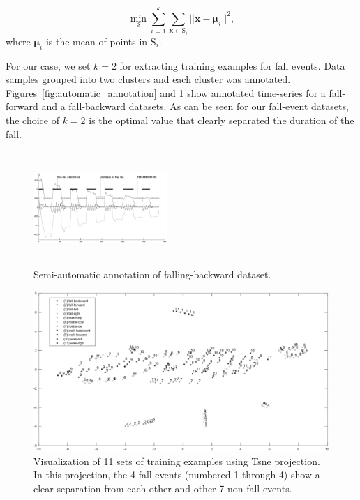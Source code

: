 \documentclass[]{IEEEtran}
\begin{document}
$$ \min _{\mathcal{S}} \sum_{i=1}^{k} \sum_{\mathbf{x} \in \mathrm{S}_i} ||
\mathbf{x} - \boldsymbol{\mu}_i ||^2,$$ where $\boldsymbol{\mu}_i $ is the mean
of points in $\mathrm{S}_i$.

For our case, we set $k = 2$ for extracting  training examples for fall events.
Data samples grouped into two clusters and  each cluster was annotated.
Figures~\ref{fig:automatic_annotation} and \ref{fig:automatic_annotation2}
show annotated time-series for a fall-forward and a fall-backward datasets. As
can be seen for our fall-event datasets, the choice of $k=2$ is the optimal
value that clearly separated the duration of the fall. 

\begin{figure}[b]
\centering
\includegraphics[width=0.45\textwidth,height = 1.7in]{plots/human_falling_backward2_bw.eps} 
\caption{Semi-automatic annotation of falling-backward dataset.}
 \label{fig:automatic_annotation2} 
\end{figure}

\begin{figure}[!bht]
\centering
\includegraphics[width=.85\textwidth]{figures/viz_all_training_examples_crop2_bw.eps} 
\caption{Visualization of 11 sets of training examples using Tsne projection.
In this projection, the 4 fall events (numbered 1 through 4) show a clear
separation from each other and other 7 non-fall events.}
\label{fig:automatic_annotation3} 
\end{figure}
\end{document}
